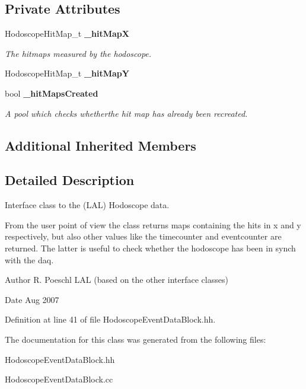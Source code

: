\subsection*{Private Attributes}
\begin{DoxyCompactItemize}
\item 
Hodoscope\-Hit\-Map\-\_\-t {\bf \-\_\-hit\-Map\-X}\label{classCALICE_1_1HodoscopeEventDataBlock_aca7b8496ec0403b0ac1dae0e137b6660}

\begin{DoxyCompactList}\small\item\em The hitmaps measured by the hodoscope. \end{DoxyCompactList}\item 
Hodoscope\-Hit\-Map\-\_\-t {\bfseries \-\_\-hit\-Map\-Y}\label{classCALICE_1_1HodoscopeEventDataBlock_a5e9c5d17dbc060cc176b3bf26c099a4d}

\item 
bool {\bf \-\_\-hit\-Maps\-Created}\label{classCALICE_1_1HodoscopeEventDataBlock_a64ba1b45e7d59de63a972a762f976791}

\begin{DoxyCompactList}\small\item\em A pool which checks whetherthe hit map has already been recreated. \end{DoxyCompactList}\end{DoxyCompactItemize}
\subsection*{Additional Inherited Members}


\subsection{Detailed Description}
Interface class to the (L\-A\-L) Hodoscope data. 

From the user point of view the class returns maps containing the hits in x and y respectively, but also other values like the timecounter and eventcounter are returned. The latter is useful to check whether the hodoscope has been in synch with the daq. \begin{DoxyAuthor}{Author}
R. Poeschl L\-A\-L (based on the other interface classes)
\end{DoxyAuthor}
\begin{DoxyDate}{Date}
Aug 2007 
\end{DoxyDate}


Definition at line 41 of file Hodoscope\-Event\-Data\-Block.\-hh.



The documentation for this class was generated from the following files\-:\begin{DoxyCompactItemize}
\item 
Hodoscope\-Event\-Data\-Block.\-hh\item 
Hodoscope\-Event\-Data\-Block.\-cc\end{DoxyCompactItemize}
